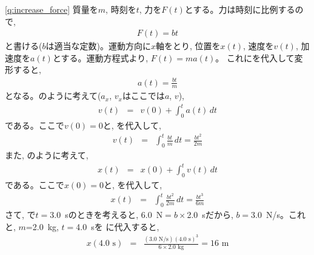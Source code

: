 \ref{q:increase_force} 
質量を$m$, 時刻を$t$, 力を$F(t)$とする。力は時刻に比例するので, 
\begin{eqnarray}
F(t)=bt\label{eq:increase_force}
\end{eqnarray}
と書ける($b$は適当な定数)。運動方向に$x$軸をとり, 
位置を$x(t)$, 速度を$v(t)$, 加速度を$a(t)$とする。運動方程式より, $F(t)=ma(t)$。
これにを代入して変形すると,
\begin{eqnarray}
a(t)=\frac{bt}{m}\label{eq:increase_force2}
\end{eqnarray}
となる。のように考えて($a_x$, $v_x$はここでは$a$, $v$), 
\begin{eqnarray}
v(t)&=&v(0)+\int_{0}^{t}a(t)\, dt\label{eq:increase_force3}
\end{eqnarray}
である。ここで$v(0)=0$と, を代入して, 
\begin{eqnarray}
v(t)&=&\int_{0}^{t}\frac{bt}{m}\, dt=\frac{bt^2}{2m}\label{eq:increase_force4}
\end{eqnarray}
また, のように考えて, 
\begin{eqnarray}
x(t)&=&x(0)+\int_{0}^{t}v(t)\, dt
\end{eqnarray}
である。ここで$x(0)=0$と, を代入して, 
\begin{eqnarray}
x(t)&=&\int_{0}^{t}\frac{bt^2}{2m}\, dt=\frac{bt^3}{6m}\label{eq:increase_force6}
\end{eqnarray}
さて, で$t=3.0$~sのときを考えると, 
6.0~N$=b\times$2.0~sだから, $b=3.0$~N/s。これと, $m$=2.0~kg, $t=$4.0~sを
に代入すると, 
\begin{eqnarray}
x(4.0\text{ s})&=&\frac{(3.0\text{ N/s})(4.0\text{ s})^3}{6\times 2.0\text{ kg}}=16\text{ m}
\end{eqnarray}
\mv

